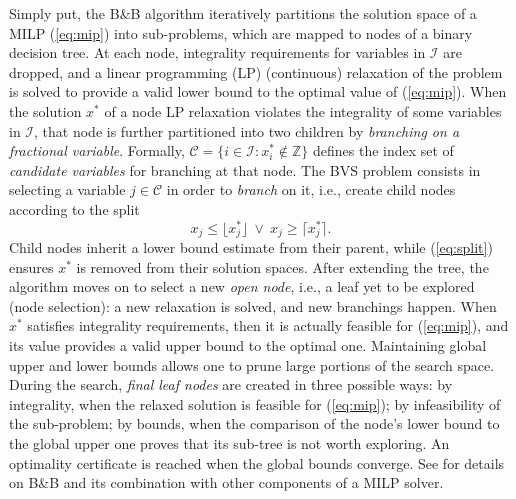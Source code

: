 \documentclass[letterpaper]{article} %
\begin{document}
Simply put, the B\&B algorithm iteratively partitions the solution space of a MILP (\ref{eq:mip}) into sub-problems, which are mapped to nodes of a binary decision tree. 
At each node, integrality requirements for variables in $\mathcal{I}$ are dropped, and a linear programming (LP) (continuous) relaxation of the problem is solved to provide a valid lower bound to the optimal value of (\ref{eq:mip}). 
When the solution $x^*$ of a node LP relaxation violates the integrality of some variables in $\mathcal{I}$, that node is further partitioned into two children by \emph{branching on a fractional variable}. 
Formally, $\mathcal{C}=\{i\in\mathcal{I}: x_i^*\notin\mathbb{Z}\}$ defines the index set of \emph{candidate variables} for branching at that node. 
The BVS problem consists in selecting a variable $j\in\mathcal{C}$ in order to \emph{branch} on it, i.e., create child nodes according to the split
\begin{equation}\label{eq:split}
    x_j\le\lfloor x_j^* \rfloor \:\vee\: x_j\ge\lceil x_j^* \rceil.
\end{equation}
Child nodes inherit a lower bound estimate from their parent, while (\ref{eq:split}) ensures $x^*$ is removed from their solution spaces. 
After extending the tree, the algorithm moves on to select a new \emph{open node}, i.e., a leaf yet to be explored (node selection): a new relaxation is solved, and new branchings happen. When $x^*$ satisfies integrality requirements, then it is actually feasible for (\ref{eq:mip}), and its value provides a valid upper bound to the optimal one. 
Maintaining global upper and lower bounds allows one to prune large portions of the search space. 
During the search, \emph{final leaf nodes} are created in three possible ways: by integrality, when the relaxed solution is feasible for (\ref{eq:mip}); by infeasibility of the sub-problem; by bounds, when the comparison of the node's lower bound to the global upper one proves that its sub-tree is not worth exploring. 
An optimality certificate is reached when the global bounds converge. 
See \cite{Wolsey1998,lodi2010mixed} for details on B\&B and its combination with other components of a MILP solver.
\end{document}

